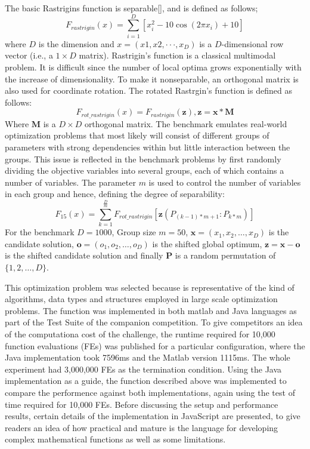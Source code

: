 \documentclass[journal,onecolumn]{IEEEtran}
\begin{document}
The basic Rastrigins function is separable[], and is defined as follows;
\begin{equation}
F_{rastrigin}(x)=\sum\limits_{i=1}^D [ x_{i}^{2}-10\cos(2\pi x_i)+10  ] 
\end{equation}
where $D$ is the dimension and $x = (x1, x2, · · · , x_{D})$ is a
$D$-dimensional row vector (i.e., a $1 × D$ matrix). Rastrigin’s function 
is a classical multimodal problem. It is difficult since the number of local
optima grows exponentially with the increase of dimensionality. To make it 
nonseparable, an orthogonal matrix is also used for coordinate rotation.
The rotated Rastrgin’s function is defined as follows:
\begin{equation}
F_{rot\_rastrigin}(x)=F_{rastrigin}(\textbf{z}), \textbf{z}= \textbf{x} * \textbf{M}
\end{equation}
Where $\textbf{M}$ is  a $D \times{D}$ orthogonal matrix. The benchmark
emulates real-world optimization problems that most likely will consist 
of different groups of parameters with strong dependencies within
but little interaction between the groups. This issue is reflected in the benchmark
problems by first randomly dividing the objective variables
into several groups, each of which contains a number of variables. The parameter $m$ 
is used to control the number of variables in each group and hence, defining the degree
of separability:
\begin{equation}
F_{15}(x)=\sum\limits_{k=1}^\frac{D}{m}F_{rot\_rastrigin}[\textbf{z}(P_{(k-1)*m+1}:P_{k*m})] 
\end{equation}
For the benchmark $D = 1000$, Group size $m = 50$, $\textbf{x} = (x_1, x_2, \ldots , x_{D})$ is the
candidate solution, $\textbf{o} = (o_1, o_2, \ldots  , o_{D})$ is the shifted global optimum,
$\textbf{z} = \textbf{x} - \textbf{o}$ is the shifted candidate solution and
finally $\textbf{P}$ is a random permutation of $\lbrace1, 2, \ldots  ,D\rbrace$.

This optimization problem was selected because is representative of the kind of
algorithms, data types and structures employed in large scale optimization problems. 
The function was implemented in both matlab and Java languages as part of  the
Test Suite of the companion competition. To give competitors an idea of the
computationa cost of the challenge, the runtime required for 10,000 function 
evaluations (FEs) was published for a particular configuration, where the Java
implementation took 7596ms and the Matlab version 1115ms. The whole experiment had
3,000,000 FEs as the termination condition. Using the Java implementation as
a guide, the function described above was implemented to compare the performence against
both implementations, again using the test of time required for 10,000 FEs. 
Before discussing the setup and performance results, certain details of
the implementation in JavaScript are presented, to give readers an idea of 
how practical and mature is the language for developing complex mathematical functions
as well as some limitations.
\end{document}
